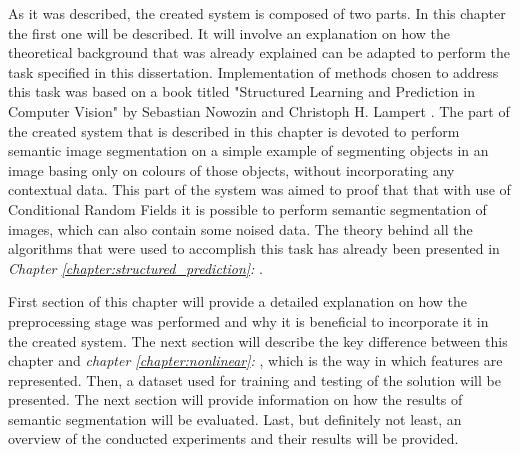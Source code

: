 As it was described, the created system is composed of two parts. In this chapter the first one will be described. It will involve an explanation on how the theoretical background that was already explained can be adapted to perform the task specified in this dissertation. Implementation of methods chosen to address this task was based on a book titled "Structured Learning and Prediction in Computer Vision" by Sebastian Nowozin and Christoph H. Lampert \cite{Nowozin}. The part of the created system that is described in this chapter is devoted to perform semantic image segmentation on a simple example of segmenting objects in an image basing only on colours of those objects, without incorporating any contextual data. This part of the system was aimed to proof that that with use of Conditional Random Fields it is possible to perform semantic  segmentation of images, which can also contain some noised data. The theory behind all the algorithms that were used to accomplish this task has already been presented in \textit{Chapter \ref{chapter:structured_prediction}: }.

First section of this chapter will provide a detailed explanation on how the preprocessing stage was performed and why it is beneficial to incorporate it in the created system. The next section will describe the key difference between this chapter and \textit{chapter \ref{chapter:nonlinear}: }, which is the way in which features are represented. Then, a dataset used for training and testing of the solution will be presented. The next section will provide information on how the results of semantic segmentation will be evaluated. Last, but definitely not least, an overview of the conducted experiments and their results will be provided.









